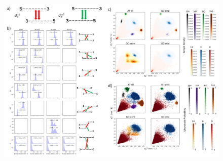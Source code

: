 \documentclass[journal=jpcbfk,manuscript=article]{achemso}
\begin{document}
\clearpage
\newpage

\begin{figure}[ht!]
	\centering
    \includegraphics[angle=90,origin=c,width=1.0\textwidth]{FigS7.pdf}
\end{figure}
\end{document}
